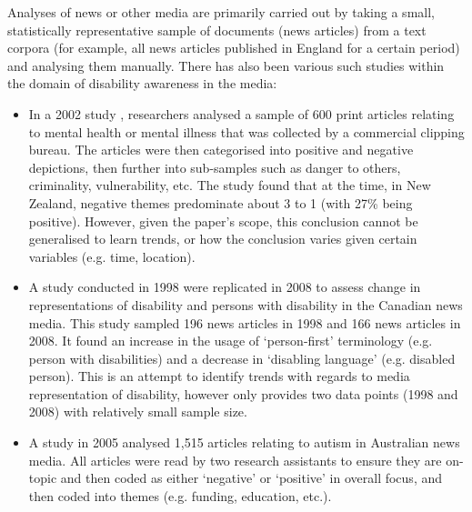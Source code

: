 \documentclass{report}
\begin{document}
Analyses of news or other media are primarily carried out by taking a small, statistically representative sample of documents (news articles) from a text corpora (for example, all news articles published in England for a certain period) and analysing them manually. There has also been various such studies within the domain of disability awareness in the media:
\begin{itemize}
	\item In a 2002 study \cite{coverdale2002depictions}, researchers analysed a sample of 600 print articles relating to mental health or mental illness that was collected by a commercial clipping bureau.
		The articles were then categorised into positive and negative depictions, then further into sub-samples such as danger to others, criminality, vulnerability, etc.
		The study found that at the time, in New Zealand, negative themes predominate about 3 to 1 (with 27\% being positive).
		However, given the paper's scope, this conclusion cannot be generalised to learn trends, or how the conclusion varies given certain variables (e.g. time, location).
	\item A study conducted in 1998 \cite{gold1999media} were replicated in 2008 \cite{devotta2013representations} to assess change in representations of disability and persons with disability in the Canadian news media.
		This study sampled 196 news articles in 1998 and 166 news articles in 2008.
		It found an increase in the usage of `person-first' terminology (e.g. person with disabilities) and a decrease in `disabling language' (e.g. disabled person). %
		This is an attempt to identify trends with regards to media representation of disability, however only provides two data points (1998 and 2008) with relatively small sample size.
	\item A study in 2005 \cite{jones2009representations} analysed 1,515 articles relating to autism in Australian news media.
		All articles were read by two research assistants to ensure they are on-topic and then coded as either `negative' or `positive' in overall focus, and then coded into themes (e.g. funding, education, etc.).
\end{itemize}
\end{document}
